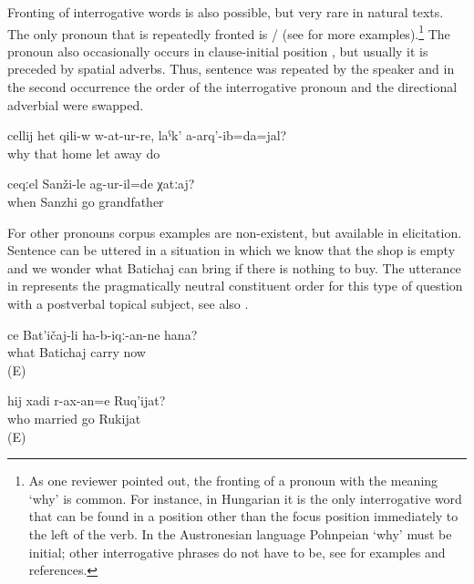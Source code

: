 Fronting of interrogative words is also possible, but very rare in natural texts. The only pronoun that is repeatedly fronted is \slash{}   (see  for more examples).\footnote{As one reviewer pointed out, the fronting of a pronoun with the meaning `why' is common. For instance, in Hungarian it is the only interrogative word that can be found in a position other than the focus position immediately to the left of the verb. In the Austronesian language Pohnpeian ‘why' must be initial; other interrogative phrases do not have to be, see \citet{Dryer2005} for examples and references.} The pronoun   also occasionally occurs in clause-initial position , but usually it is preceded by spatial adverbs. Thus, sentence  was repeated by the speaker and in the second occurrence the order of the interrogative pronoun and the directional adverbial were swapped.
%
\begin{exe}
	\ex	\label{ex:‎Why did I leave him in the room and did not take him away}
	\gll	cellij	het	qili-w	w-at-ur-re,	laˁk'	a-arq'-ib=da=jal?\\
		why	that	home	let	away	do\\
	\glt	{}

	\ex	\label{ex:‎‎‎When did grandfather go to Sanzhi}
	\gll	ceqːel	Sanži-le	ag-ur-il=de	χatːaj?\\
		when	Sanzhi	go	grandfather\\
	\glt	{}
\end{exe}

For other pronouns corpus examples are non-existent, but available in elicitation. Sentence  can be uttered in a situation in which we know that the shop is empty and we wonder what Batichaj can bring if there is nothing to buy. The utterance in  represents the pragmatically neutral constituent order for this type of question with a postverbal topical subject, see also .
%
\begin{exe}
	\ex	\label{ex:What will Batichaj bring now}
	\gll	ce	Bat'ičaj-li	ha-b-iqː-an-ne hana?\\
		what	Batichaj	carry	now\\
	\glt	{} (E)

	\ex	\label{ex:Who should Rukijat marry}
	\gll	hij	xadi	r-ax-an=e	Ruq'ijat?\\
		who	married	go	Rukijat\\
	\glt	{} (E)
\end{exe}

